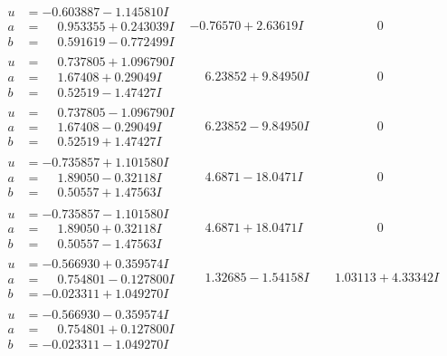 \documentclass[1p]{elsarticle_modified}
\theoremstyle{definition}
\begin{document}
$$\begin{array}{c|c|c}
\begin{aligned}
u &= -0.603887 - 1.145810 I \\
a &= \phantom{-}0.953355 + 0.243039 I \\
b &= \phantom{-}0.591619 - 0.772499 I\end{aligned}
 & -0.76570 + 2.63619 I & \phantom{-0.000000 } 0 \\ \hline\begin{aligned}
u &= \phantom{-}0.737805 + 1.096790 I \\
a &= \phantom{-}1.67408 + 0.29049 I \\
b &= \phantom{-}0.52519 - 1.47427 I\end{aligned}
 & \phantom{-}6.23852 + 9.84950 I & \phantom{-0.000000 } 0 \\ \hline\begin{aligned}
u &= \phantom{-}0.737805 - 1.096790 I \\
a &= \phantom{-}1.67408 - 0.29049 I \\
b &= \phantom{-}0.52519 + 1.47427 I\end{aligned}
 & \phantom{-}6.23852 - 9.84950 I & \phantom{-0.000000 } 0 \\ \hline\begin{aligned}
u &= -0.735857 + 1.101580 I \\
a &= \phantom{-}1.89050 - 0.32118 I \\
b &= \phantom{-}0.50557 + 1.47563 I\end{aligned}
 & \phantom{-}4.6871 - 18.0471 I & \phantom{-0.000000 } 0 \\ \hline\begin{aligned}
u &= -0.735857 - 1.101580 I \\
a &= \phantom{-}1.89050 + 0.32118 I \\
b &= \phantom{-}0.50557 - 1.47563 I\end{aligned}
 & \phantom{-}4.6871 + 18.0471 I & \phantom{-0.000000 } 0 \\ \hline\begin{aligned}
u &= -0.566930 + 0.359574 I \\
a &= \phantom{-}0.754801 - 0.127800 I \\
b &= -0.023311 + 1.049270 I\end{aligned}
 & \phantom{-}1.32685 - 1.54158 I & \phantom{-}1.03113 + 4.33342 I \\ \hline\begin{aligned}
u &= -0.566930 - 0.359574 I \\
a &= \phantom{-}0.754801 + 0.127800 I \\
b &= -0.023311 - 1.049270 I\end{aligned}

\end{array}$$
\end{document}
